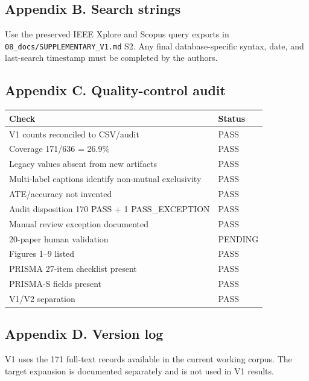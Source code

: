 \documentclass[
  journal,
  10pt]{IEEEtran}
\newcounter{none} %
\begin{document}
\subsection{Appendix B. Search strings}\label{appendix-b-search-strings}

Use the preserved IEEE Xplore and Scopus query exports in
\texttt{08\_docs/SUPPLEMENTARY\_V1.md} S2. Any final database-specific
syntax, date, and last-search timestamp must be completed by the
authors.

\subsection{Appendix C. Quality-control
audit}\label{appendix-c-quality-control-audit}

{\def\LTcaptype{none} %
\begin{tabularx}{\columnwidth}{@{}Xl@{}}
\toprule
Check & Status \\
\midrule

\bottomrule

V1 counts reconciled to CSV/audit & PASS \\
Coverage 171/636 = 26.9\% & PASS \\
Legacy values absent from new artifacts & PASS \\
Multi-label captions identify non-mutual exclusivity & PASS \\
ATE/accuracy not invented & PASS \\
Audit disposition 170 PASS + 1 PASS\_EXCEPTION & PASS \\
Manual review exception documented & PASS \\
20-paper human validation & PENDING \\
Figures 1--9 listed & PASS \\
PRISMA 27-item checklist present & PASS \\
PRISMA-S fields present & PASS \\
V1/V2 separation & PASS \\
\end{tabularx}
}

\subsection{Appendix D. Version log}\label{appendix-d-version-log}

V1 uses the 171 full-text records available in the current working
corpus. The target expansion is documented separately and is not used in
V1 results.
\end{document}
